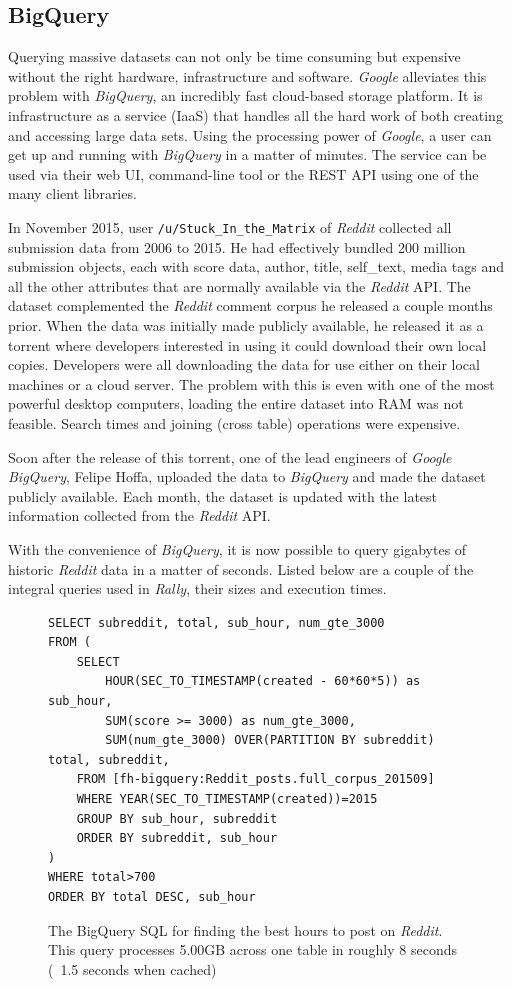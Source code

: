 \documentclass[msc,oneside]{ubcthesis}%
\begin{document}
\subsection{BigQuery}
Querying massive datasets can not only be time consuming but expensive without the right hardware, infrastructure and software. \textit{Google} alleviates this problem with \textit{BigQuery}, an incredibly fast cloud-based storage platform. It is infrastructure as a service (IaaS) that handles all the hard work of both creating and accessing large data sets. Using the processing power of \textit{Google}, a user can get up and running with \textit{BigQuery} in a matter of minutes. The service can be used via their web UI, command-line tool or the REST API using one of the many client libraries. 
\par
In November 2015, user \texttt{/u/Stuck\_In\_the\_Matrix} of \textit{Reddit} collected all submission data from 2006 to 2015. He had effectively bundled 200 million submission objects, each with score data, author, title, self{\_}text, media tags and all the other attributes that are normally available via the \textit{Reddit} API. The dataset complemented the \textit{Reddit} comment corpus he released a couple months prior. When the data was initially made publicly available, he released it as a torrent where developers interested in using it could download their own local copies. Developers were all downloading the data for use either on their local machines or a cloud server. The problem with this is even with one of the most powerful desktop computers, loading the entire dataset into RAM was not feasible. Search times and joining (cross table) operations were expensive. 
\par
Soon after the release of this torrent, one of the lead engineers of \textit{Google BigQuery}, Felipe Hoffa, uploaded the data to \textit{BigQuery} and made the dataset publicly available. Each month, the dataset is updated with the latest information collected from the \textit{Reddit} API.
\par
With the convenience of \textit{BigQuery}, it is now possible to query gigabytes of historic \textit{Reddit} data in a matter of seconds. Listed below are a couple of the integral queries used in \textit{Rally}, their sizes and execution times.

\begin{figure}[H]
\begin{lstlisting}
SELECT subreddit, total, sub_hour, num_gte_3000
FROM (
	SELECT
		HOUR(SEC_TO_TIMESTAMP(created - 60*60*5)) as sub_hour,
		SUM(score >= 3000) as num_gte_3000,
		SUM(num_gte_3000) OVER(PARTITION BY subreddit) total, subreddit,
	FROM [fh-bigquery:Reddit_posts.full_corpus_201509]
	WHERE YEAR(SEC_TO_TIMESTAMP(created))=2015
	GROUP BY sub_hour, subreddit
	ORDER BY subreddit, sub_hour
)
WHERE total>700
ORDER BY total DESC, sub_hour
\end{lstlisting}
\caption[Query finding the best hours to post on \textit{Reddit}]{
The BigQuery SQL for finding the best hours to post on \textit{Reddit}. This query processes 5.00GB across one table in roughly 8 seconds (~1.5 seconds when cached)}
\end{figure}
\end{document}
